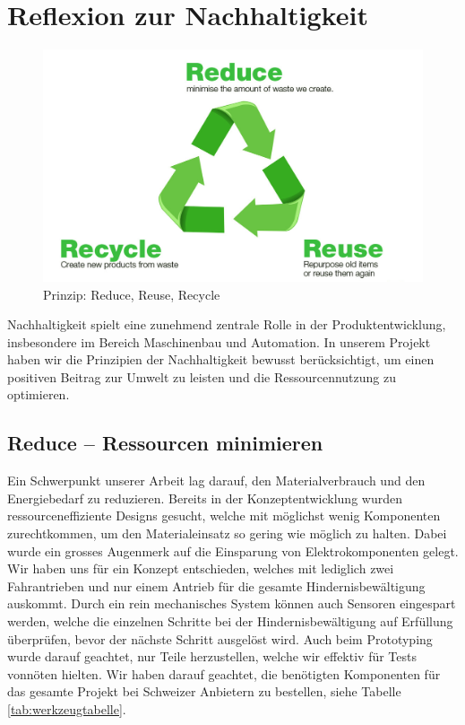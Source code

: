 \documentclass[../main.tex]{subfiles}
\begin{document}
\newpage
\section{Reflexion zur Nachhaltigkeit}

\begin{figure}[H] %
    \centering
        \includegraphics[width=0.7\linewidth]{img/nachhaltigkeit/3R-reduce-reuse-recycle.jpg}
        \caption[Prinzip: Reduce, Reuse, Recycle]{Prinzip: Reduce, Reuse, Recycle \footnotemark}
        
        \label{fig:3R}
    \end{figure} 


Nachhaltigkeit spielt eine zunehmend zentrale Rolle in der Produktentwicklung, insbesondere im Bereich Maschinenbau und Automation. In unserem Projekt haben wir die Prinzipien der Nachhaltigkeit bewusst berücksichtigt, um einen positiven Beitrag zur Umwelt zu leisten und die Ressourcennutzung zu optimieren.

\subsection{Reduce – Ressourcen minimieren}

Ein Schwerpunkt unserer Arbeit lag darauf, den Materialverbrauch und den Energiebedarf zu reduzieren. Bereits in der Konzeptentwicklung wurden ressourceneffiziente Designs gesucht, welche mit möglichst wenig Komponenten zurechtkommen, um den Materialeinsatz so gering wie möglich zu halten. Dabei wurde ein grosses Augenmerk auf die Einsparung von Elektrokomponenten gelegt. Wir haben uns für ein Konzept entschieden, welches mit lediglich zwei Fahrantrieben und nur einem Antrieb für die gesamte Hindernisbewältigung auskommt. Durch ein rein mechanisches System können auch Sensoren eingespart werden, welche die einzelnen Schritte bei der Hindernisbewältigung auf Erfüllung überprüfen, bevor der nächste Schritt ausgelöst wird. Auch beim Prototyping wurde darauf geachtet, nur Teile herzustellen, welche wir effektiv für Tests vonnöten hielten. Wir haben darauf geachtet, die benötigten Komponenten für das gesamte Projekt bei Schweizer Anbietern zu bestellen, siehe Tabelle \ref{tab:werkzeugtabelle}.
\end{document}

